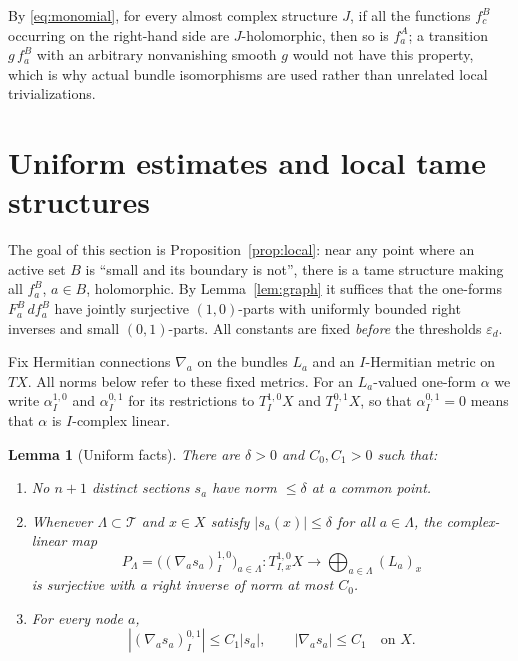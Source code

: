 \documentclass[12pt]{article}
\newtheorem{lemma}[theorem]{Lemma}
\theoremstyle{remark}
\newcommand{\eps}{\varepsilon}
\newcommand{\cT}{\mathcal T}
\begin{document}
By \eqref{eq:monomial}, for every almost complex structure $J$, if all
the functions $f^B_c$ occurring on the right-hand side are
$J$-holomorphic, then so is $f^A_a$; a transition $g\,f^B_a$ with an
arbitrary nonvanishing smooth $g$ would not have this property, which
is why actual bundle isomorphisms are used rather than unrelated local
trivializations.

\section{Uniform estimates and local tame structures}\label{sec:estimates}

The goal of this section is Proposition~\ref{prop:local}: near any
point where an active set $B$ is ``small and its boundary is not'',
there is a tame structure making all $f^B_a$, $a\in B$, holomorphic.
By Lemma~\ref{lem:graph} it suffices that the one-forms $F^B_a\,df^B_a$
have jointly surjective $(1,0)$-parts with uniformly bounded right
inverses and small $(0,1)$-parts. All constants are fixed \emph{before}
the thresholds $\eps_d$.

Fix Hermitian connections $\nabla_a$ on the bundles $L_a$ and an
$I$-Hermitian metric on $TX$. All norms below refer to these fixed
metrics. For an $L_a$-valued one-form $\alpha$ we write
$\alpha^{1,0}_I$ and $\alpha^{0,1}_I$ for its restrictions to
$T^{1,0}_IX$ and $T^{0,1}_IX$, so that $\alpha^{0,1}_I=0$ means that
$\alpha$ is $I$-complex linear.

\begin{lemma}[Uniform facts]\label{lem:uniform}
There are $\delta>0$ and $C_0,C_1>0$ such that:
\begin{enumerate}
\item No $n+1$ distinct sections $s_a$ have norm $\le\delta$ at a
common point.
\item Whenever $\Lambda\subset\cT$ and $x\in X$ satisfy $|s_a(x)|\le\delta$
for all $a\in\Lambda$, the complex-linear map
\begin{equation}\label{eq:PK}
 P_\Lambda=\bigl((\nabla_as_a)^{1,0}_I\bigr)_{a\in\Lambda}
 \colon T^{1,0}_{I,x}X\longrightarrow\bigoplus_{a\in\Lambda}(L_a)_x
\end{equation}
is surjective with a right inverse of norm at most $C_0$.
\item For every node $a$,
\begin{equation}\label{eq:anti}
 |(\nabla_as_a)^{0,1}_I|\le C_1|s_a|,\qquad|\nabla_as_a|\le C_1
 \quad\text{on }X.
\end{equation}
\end{enumerate}
\end{lemma}
\end{document}
